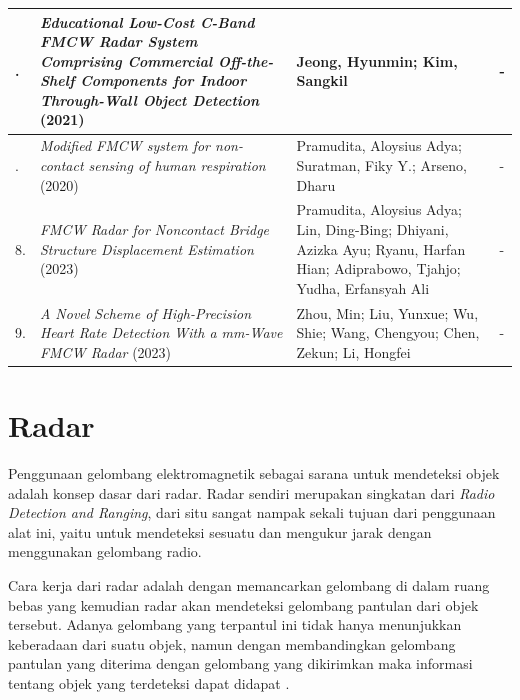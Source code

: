 \begin{center}
\begin{longtable}{|>{\centering\arraybackslash}p{0.6cm}|p{4cm}|p{4cm}|p{4cm}|}
	6. & \textit{Educational Low-Cost C-Band FMCW Radar System Comprising Commercial Off-the-Shelf Components for Indoor Through-Wall Object Detection} (2021)
	& Jeong, Hyunmin; Kim, Sangkil
	& - \\ \hline
	
	7. & \textit{Modified FMCW system for non-contact sensing of human respiration} (2020)
	& Pramudita, Aloysius Adya; Suratman, Fiky Y.; Arseno, Dharu
	& - \\ \hline
	
	8. & \textit{FMCW Radar for Noncontact Bridge Structure Displacement Estimation} (2023)
	& Pramudita, Aloysius Adya; Lin, Ding-Bing; Dhiyani, Azizka Ayu; Ryanu, Harfan Hian; Adiprabowo, Tjahjo; Yudha, Erfansyah Ali
	& - \\ \hline
	
	9. & \textit{A Novel Scheme of High-Precision Heart Rate Detection With a mm-Wave FMCW Radar} (2023)
	& Zhou, Min; Liu, Yunxue; Wu, Shie; Wang, Chengyou; Chen, Zekun; Li, Hongfei
	& - \\ \hline
	\end{longtable}
\end{center}

\section{Radar}

Penggunaan gelombang elektromagnetik sebagai sarana untuk mendeteksi objek adalah konsep dasar dari radar. Radar sendiri merupakan singkatan dari \textit{Radio Detection and Ranging}, dari situ sangat nampak sekali tujuan dari penggunaan alat ini, yaitu untuk mendeteksi sesuatu dan mengukur jarak dengan menggunakan gelombang radio. 

Cara kerja dari radar adalah dengan memancarkan gelombang di dalam ruang bebas yang kemudian radar akan mendeteksi gelombang pantulan dari objek tersebut. Adanya gelombang yang terpantul ini tidak hanya menunjukkan keberadaan dari suatu objek, namun dengan membandingkan gelombang pantulan yang diterima dengan gelombang yang dikirimkan maka informasi tentang objek yang terdeteksi dapat didapat \cite{Skolnik2001}.


